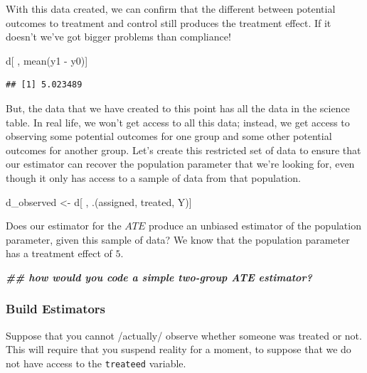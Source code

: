 \documentclass[
]{article}
\newenvironment{Shaded}{\begin{snugshade}}{\end{snugshade}}
\newcommand{\DocumentationTok}[1]{\textcolor[rgb]{0.56,0.35,0.01}{\textbf{\textit{#1}}}}
\newcommand{\FunctionTok}[1]{\textcolor[rgb]{0.00,0.00,0.00}{#1}}
\newcommand{\NormalTok}[1]{#1}
\newcommand{\OtherTok}[1]{\textcolor[rgb]{0.56,0.35,0.01}{#1}}
\newcommand{\SpecialCharTok}[1]{\textcolor[rgb]{0.00,0.00,0.00}{#1}}
\begin{document}
With this data created, we can confirm that the different between potential outcomes to treatment and control still produces the treatment effect. If it doesn't we've got bigger problems than compliance!

\begin{Shaded}
\begin{Highlighting}[]
\NormalTok{d[ , }\FunctionTok{mean}\NormalTok{(y1 }\SpecialCharTok{{-}}\NormalTok{ y0)]}
\end{Highlighting}
\end{Shaded}

\begin{verbatim}
## [1] 5.023489
\end{verbatim}

But, the data that we have created to this point has all the data in the science table. In real life, we won't get access to all this data; instead, we get access to observing some potential outcomes for one group and some other potential outcomes for another group. Let's create this restricted set of data to ensure that our estimator can recover the population parameter that we're looking for, even though it only has access to a sample of data from that population.

\begin{Shaded}
\begin{Highlighting}[]
\NormalTok{d\_observed }\OtherTok{\textless{}{-}}\NormalTok{ d[ , .(assigned, treated, Y)]}
\end{Highlighting}
\end{Shaded}

Does our estimator for the \(ATE\) produce an unbiased estimator of the population parameter, given this sample of data? We know that the population parameter has a treatment effect of \(5\).

\begin{Shaded}
\begin{Highlighting}[]
\DocumentationTok{\#\# how would you code a simple two{-}group ATE estimator? }
\end{Highlighting}
\end{Shaded}

\hypertarget{build-estimators}{%
\subsubsection{Build Estimators}\label{build-estimators}}

Suppose that you cannot /actually/ observe whether someone was treated or not. This will require that you suspend reality for a moment, to suppose that we do not have access to the \texttt{treateed} variable.
\end{document}

